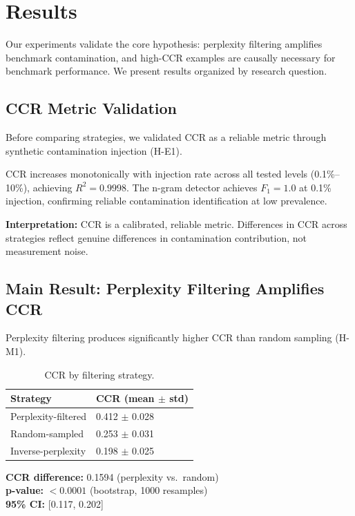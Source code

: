 \section{Results}

Our experiments validate the core hypothesis: perplexity filtering amplifies benchmark contamination, and high-CCR examples are causally necessary for benchmark performance. We present results organized by research question.

\subsection{CCR Metric Validation}

Before comparing strategies, we validated CCR as a reliable metric through synthetic contamination injection (H-E1).

CCR increases monotonically with injection rate across all tested levels (0.1\%--10\%), achieving $R^2 = 0.9998$. The n-gram detector achieves $F_1 = 1.0$ at 0.1\% injection, confirming reliable contamination identification at low prevalence.

\textbf{Interpretation:} CCR is a calibrated, reliable metric. Differences in CCR across strategies reflect genuine differences in contamination contribution, not measurement noise.

\subsection{Main Result: Perplexity Filtering Amplifies CCR}

Perplexity filtering produces significantly higher CCR than random sampling (H-M1).

\begin{table}[h]
\centering
\begin{tabular}{@{}ll@{}}
\toprule
Strategy & CCR (mean $\pm$ std) \\
\midrule
Perplexity-filtered & 0.412 $\pm$ 0.028 \\
Random-sampled & 0.253 $\pm$ 0.031 \\
Inverse-perplexity & 0.198 $\pm$ 0.025 \\
\bottomrule
\end{tabular}
\caption{CCR by filtering strategy.}
\end{table}

\textbf{CCR difference:} 0.1594 (perplexity vs.\ random)\\
\textbf{p-value:} $< 0.0001$ (bootstrap, 1000 resamples)\\
\textbf{95\% CI:} [0.117, 0.202]

